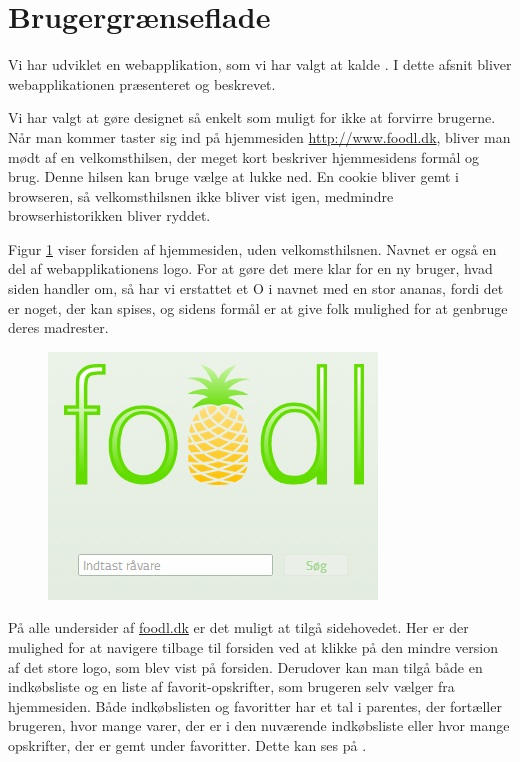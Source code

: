 \section{Brugergrænseflade}
\label{sec:webapplikationen}
Vi har udviklet en webapplikation, som vi har valgt at kalde \Foodl. I dette afsnit bliver webapplikationen præsenteret og beskrevet.

Vi har valgt at gøre designet så enkelt som muligt for ikke at forvirre brugerne. Når man kommer taster sig ind på hjemmesiden \url{http://www.foodl.dk}, bliver man mødt af en velkomsthilsen, der meget kort beskriver hjemmesidens formål og brug. Denne hilsen kan bruge vælge at lukke ned. En cookie bliver gemt i browseren, så velkomsthilsnen ikke bliver vist igen, medmindre browserhistorikken bliver ryddet.

Figur \ref{fig:foodl-forside} viser forsiden af hjemmesiden, uden velkomsthilsnen. Navnet \Foodl er også en del af webapplikationens logo. For at gøre det mere klar for en ny bruger, hvad siden handler om, så har vi erstattet et O i navnet med en stor ananas, fordi det er noget, der kan spises, og sidens formål er at give folk mulighed for at genbruge deres madrester. 

\begin{figure}[H]
	\centering
	\includegraphics[scale=0.7]{billeder/foodl/forside.jpg}
	\label{fig:foodl-forside}
\end{figure}

På alle undersider af \url{foodl.dk} er det muligt at tilgå sidehovedet. Her er der mulighed for at navigere tilbage til forsiden ved at klikke på den mindre version af det store logo, som blev vist på forsiden. Derudover kan man tilgå både en indkøbsliste og en liste af favorit-opskrifter, som brugeren selv vælger fra hjemmesiden. Både indkøbslisten og favoritter har et tal i parentes, der \fx fortæller brugeren, hvor mange varer, der er i den nuværende indkøbsliste eller hvor mange opskrifter, der er gemt under favoritter. Dette kan ses på .

